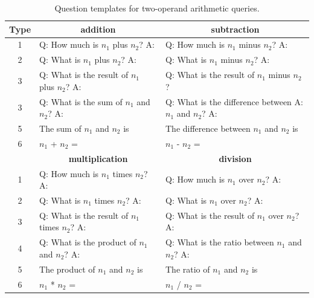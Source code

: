\documentclass[11pt]{article}
\begin{document}
 \begin{table}[t]
\small 
    \centering
    \begin{tabular}{c ll}
    \toprule
    \textbf{Type} & \multicolumn{1}{c}{\bf addition} & \multicolumn{1}{c}{\bf subtraction}   \\ 
    \midrule
    1 & Q: How much is $n_1$ plus $n_2$? A: & Q: How much is $n_1$ minus $n_2$? A: \\
    2 & Q: What is $n_1$ plus $n_2$? A: & Q: What is $n_1$ minus $n_2$? A:  \\
    3 & Q: What is the result of $n_1$ plus $n_2$? A: & Q: What is the result of $n_1$ minus $n_2$? \\ 
    3 & Q: What is the sum of $n_1$ and $n_2$? A: & Q: What is the difference between A: $n_1$ and $n_2$? A:\\ 
    5 & The sum of $n_1$ and $n_2$ is & The difference between $n_1$ and $n_2$ is \\
    6 & $n_1$ + $n_2$ = & $n_1$ - $n_2$ = \\
    \midrule 
    & \multicolumn{1}{c}{\bf multiplication}  & \multicolumn{1}{c}{\bf division} \\ 
    \midrule
    1 & Q: How much is $n_1$ times $n_2$? A: & Q: How much is $n_1$ over $n_2$? A: \\ 
    2 & Q: What is $n_1$ times $n_2$? A: & Q: What is $n_1$ over $n_2$? A: \\  
    3 & Q: What is the result of $n_1$ times $n_2$? A: & Q: What is the result of $n_1$ over $n_2$? A: \\  
    4 & Q: What is the product of $n_1$ and $n_2$? A: & Q: What is the ratio between $n_1$ and $n_2$? A: \\  
    5 & The product of $n_1$ and $n_2$ is & The ratio of $n_1$ and $n_2$ is \\
    6 & $n_1$ * $n_2$ = & $n_1$ / $n_2$ =\\
    \bottomrule
    \end{tabular}
    \caption{Question templates for two-operand arithmetic queries.}
    \label{table:templates}
\end{table}
\end{document}
